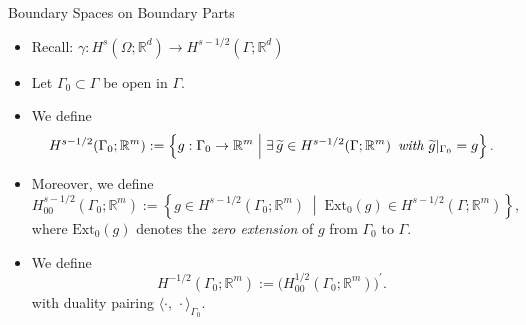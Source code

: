 \documentclass[10pt,aspectratio=169]{beamer}
\def\R{{\mathbb R}}
\begin{document}
\begin{frame}{Boundary Spaces on Boundary Parts}
	\begin{itemize}
		\item Recall: $\gamma: H^s(\Omega;\R^d)\to H^{s-1/2}(\Gamma;\R^d)$
		\item Let $\Gamma_0\subset\Gamma$ be open in $\Gamma$.
		\item We define
		      \begin{equation*}
			      H^{s-1/2}(\Gamma_0;\R^m)
			      :=
			      \left\{g:\Gamma_0\to \R^m\;\middle|\;\exists\,\widetilde g\in H^{s-1/2}(\Gamma;\R^m)\text{\em\enspace with }\widetilde g|_{\Gamma_0}=g\right\}.
		      \end{equation*}
		\item Moreover, we define
		      \begin{equation*}
			      H^{s-1/2}_{00}(\Gamma_0;\R^m)
			      :=
			      \left\{g\in H^{s-1/2}(\Gamma_0;\R^m)\;\middle|\;\mathrm{Ext}_0(g)\in H^{s-1/2}(\Gamma;\R^m)\right\},
		      \end{equation*}
		      where $\mathrm{Ext}_0(g)$ denotes the {\em zero extension} of $g$ from $\Gamma_0$ to $\Gamma$.
		\item We define
		      \begin{equation*}
			      H^{-1/2}(\Gamma_0;\R^m):=\big(H^{1/2}_{00}(\Gamma_0;\R^m)\big)^\prime.
		      \end{equation*}
		      with duality pairing $\langle\cdot,\,\cdot\rangle_{\Gamma_0}$.
	\end{itemize}
\end{frame}
\end{document}
